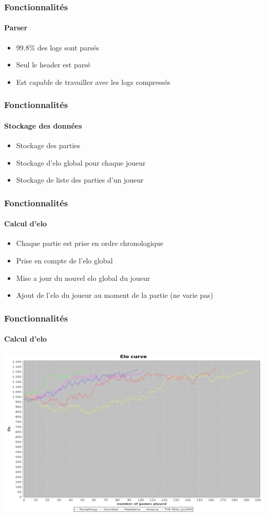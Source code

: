 \documentclass{beamer}
\begin{document}
\begin{frame}
  \frametitle{Fonctionnalités}
  \framesubtitle{Parser}
  \begin{itemize}
  \item 99.8\% des logs sont parsés
  \item Seul le header est parsé
  \item Est capable de travailler avec les logs compressés
  \end{itemize}
\end{frame}

\begin{frame}
  \frametitle{Fonctionnalités}
  \framesubtitle{Stockage des données}
  \begin{itemize}
  \item Stockage des parties
  \item Stockage d'elo global pour chaque joueur
  \item Stockage de liste des parties d'un joueur
  \end{itemize}
\end{frame}

\begin{frame}
  \frametitle{Fonctionnalités}
  \framesubtitle{Calcul d'elo}
  \begin{itemize}
  \item Chaque partie est prise en ordre chronologique
  \item Prise en compte de l'elo global
  \item Mise a jour du nouvel elo global du joueur
  \item Ajout de l'elo du joueur au moment de la partie (ne varie pas)
  \end{itemize}
\end{frame}

\begin{frame}
  \frametitle{Fonctionnalités}
  \framesubtitle{Calcul d'elo}
  \begin{center}
    \includegraphics[scale=0.15,keepaspectratio]{elo}
  \end{center}
\end{frame}
\end{document}
